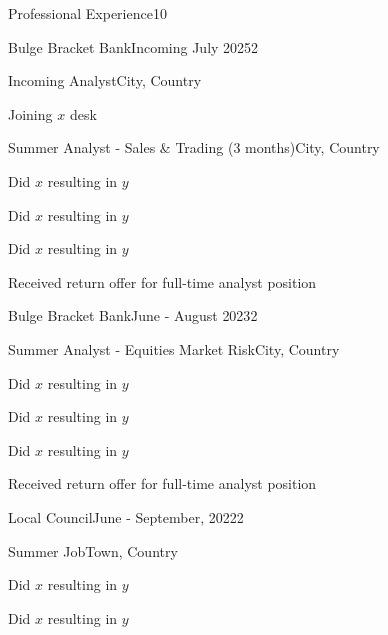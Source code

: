 \documentclass[10pt,a4paper]{CV}
\begin{document}
\begin{Section}{Professional Experience}{10}
    \begin{Institution}{Bulge Bracket Bank}{Incoming July 2025}{2}
        \begin{Position}{Incoming Analyst}{City, Country}
            \item Joining $x$ desk
            \vspace{-4pt}
        \end{Position}
        \begin{Position}{Summer Analyst - Sales \& Trading (3 months)}{City, Country}
            \item Did $x$ resulting in $y$
            \item Did $x$ resulting in $y$
            \item Did $x$ resulting in $y$
            \item Received return offer for full-time analyst position
        \end{Position}
    \end{Institution}
    
    \begin{Institution}{Bulge Bracket Bank}{June - August 2023}{2}
        \begin{Position}{Summer Analyst - Equities Market Risk}{City, Country}
            \item Did $x$ resulting in $y$
            \item Did $x$ resulting in $y$
            \item Did $x$ resulting in $y$
            \item Received return offer for full-time analyst position
        \end{Position}
    \end{Institution}
    
    \begin{Institution}{Local Council}{June - September, 2022}{2}
        \begin{Position}{Summer Job}{Town, Country}
            \item Did $x$ resulting in $y$
            \item Did $x$ resulting in $y$
        \end{Position}
    \end{Institution}
\end{Section}
\end{document}
